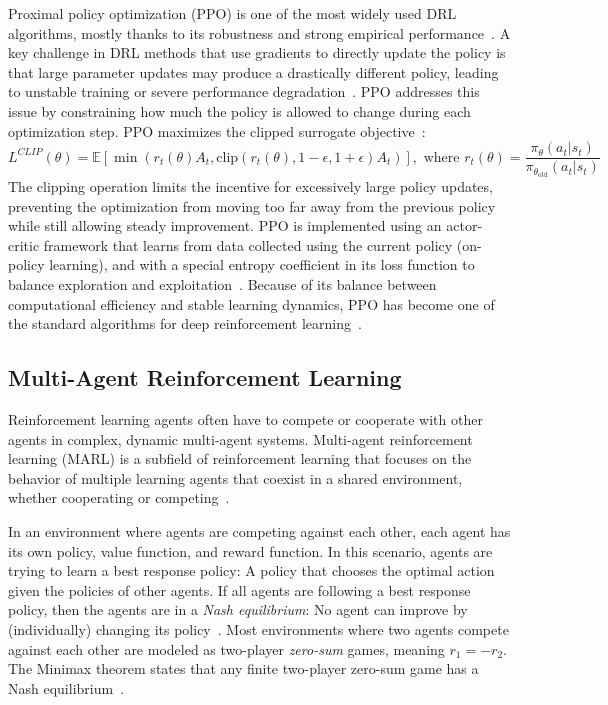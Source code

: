 Proximal policy optimization (PPO) is one of the most widely used DRL algorithms, mostly thanks to its robustness and strong empirical performance~\cite{wang2024drl,schulman2017ppo}.
A key challenge in DRL methods that use gradients to directly update the policy is that large parameter updates may produce a drastically different policy, leading to unstable training or severe performance degradation~\cite{schulman2017ppo}.
PPO addresses this issue by constraining how much the policy is allowed to change during each optimization step.
PPO maximizes the clipped surrogate objective~\cite{schulman2017ppo}:
\begin{equation}
    L^{CLIP}(\theta) = \mathbb{E}\left[ \min\left(r_t(\theta)A_t, \mathrm{clip}\left(r_t(\theta), 1-\epsilon, 1+\epsilon\right)A_t\right) \right],\text{ where } r_t(\theta) = \frac{\pi_\theta(a_t|s_t)}{\pi_{\theta_{\mathrm{old}}}(a_t|s_t)}
\end{equation}
The clipping operation limits the incentive for excessively large policy updates, preventing the optimization from moving too far away from the previous policy while still allowing steady improvement.
PPO is implemented using an actor-critic framework that learns from data collected using the current policy (on-policy learning), and with a special entropy coefficient in its loss function to balance exploration and exploitation~\cite{schulman2017ppo}.
Because of its balance between computational efficiency and stable learning dynamics, PPO has become one of the standard algorithms for deep reinforcement learning~\cite{wang2024drl}.

\subsection{Multi-Agent Reinforcement Learning} \label{sec:rl:marl}
Reinforcement learning agents often have to compete or cooperate with other agents in complex, dynamic multi-agent systems.
Multi-agent reinforcement learning (MARL) is a subfield of reinforcement learning that focuses on the behavior of multiple learning agents that coexist in a shared environment, whether cooperating or competing~\cite{stefano2024marl,zhang2025selfplay}.

In an environment where agents are competing against each other, each agent has its own policy, value function, and reward function.
In this scenario, agents are trying to learn a best response policy: A policy that chooses the optimal action given the policies of other agents.
If all agents are following a best response policy, then the agents are in a \textit{Nash equilibrium}: No agent can improve by (individually) changing its policy~\cite{stefano2024marl,zhang2025selfplay}.
Most environments where two agents compete against each other are modeled as two-player \textit{zero-sum} games, meaning $r_1 = -r_2$.
The Minimax theorem states that any finite two-player zero-sum game has a Nash equilibrium~\cite{neumann1928minimax}.

